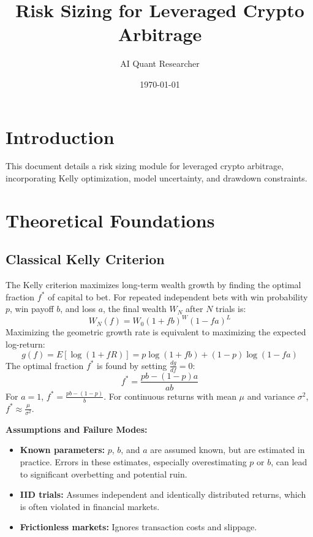 \documentclass{article}
\begin{document}
\title{Risk Sizing for Leveraged Crypto Arbitrage}
\author{AI Quant Researcher}
\date{\today}
\maketitle

\section{Introduction}
This document details a risk sizing module for leveraged crypto arbitrage, incorporating Kelly optimization, model uncertainty, and drawdown constraints.

\section{Theoretical Foundations}

\subsection{Classical Kelly Criterion}
The Kelly criterion maximizes long-term wealth growth by finding the optimal fraction $f^*$ of capital to bet. For repeated independent bets with win probability $p$, win payoff $b$, and loss $a$, the final wealth $W_N$ after $N$ trials is:
$$W_N(f) = W_0 (1+fb)^W (1-fa)^L$$
Maximizing the geometric growth rate is equivalent to maximizing the expected log-return:
$$g(f) = E[\log(1+fR)] = p\log(1+fb) + (1-p)\log(1-fa)$$
The optimal fraction $f^*$ is found by setting $\frac{dg}{df} = 0$:
$$f^* = \frac{pb - (1-p)a}{ab}$$
For $a=1$, $f^* = \frac{pb - (1-p)}{b}$.  For continuous returns with mean $\mu$ and variance $\sigma^2$, $f^* \approx \frac{\mu}{\sigma^2}$.

\textbf{Assumptions and Failure Modes:}
\begin{itemize}
    \item \textbf{Known parameters:} $p$, $b$, and $a$ are assumed known, but are estimated in practice. Errors in these estimates, especially overestimating $p$ or $b$, can lead to significant overbetting and potential ruin.
    \item \textbf{IID trials:}  Assumes independent and identically distributed returns, which is often violated in financial markets.
    \item \textbf{Frictionless markets:} Ignores transaction costs and slippage.
\end{itemize}
\end{document}

